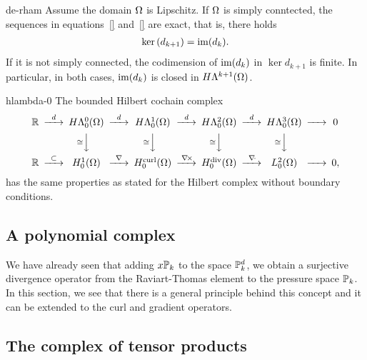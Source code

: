 \begin{Theorem}{de-rham}
  Assume the domain $\domain$ is Lipschitz.  If $\domain$ is simply
  conntected, the sequences in equations~\eqref{} and~\eqref{} are
  exact, that is, there holds
  \begin{gather}
    \ker {d_{k+1}} = \range{d_k}.
  \end{gather}
  If it is not simply connected, the codimension of $\range{d_k}$ in
  $\ker{d_{k+1}}$ is finite. In particular, in both cases,
  $\range{d_k}$ is closed in $H\Lambda^{k+1}(\domain)$.
\end{Theorem}

\begin{Lemma}{hlambda-0}
  The bounded Hilbert cochain complex
  \begin{gather}\minCDarrowwidth20pt
    \begin{CD}
      \R
      @>{d}>> H\Lambda^0_0(\domain)
      @>{d}>> H\Lambda^1_0(\domain)
      @>{d}>> H\Lambda^2_0(\domain)
      @>{d}>> H\Lambda^3_0(\domain)
      @>>> 0
      \\
      @.
      @V{\cong}VV
      @V{\cong}VV
      @V{\cong}VV
      @V{\cong}VV
      \\
      \R
      @>{\subset}>> H^1_0(\domain)
      @>{\nabla}>> \Hcurl_0(\domain)
      @>{\curl}>> \Hdiv_0(\domain)
      @>{\div}>> L^2_0(\domain)
      @>>> 0,
    \end{CD}
  \end{gather}
  has the same properties as stated for the Hilbert complex without
  boundary conditions.
\end{Lemma}

\subsection{A polynomial complex}

\begin{intro}
  We have already seen that adding $x\P_k$ to the space $\P_k^d$, we
  obtain a surjective divergence operator from the Raviart-Thomas
  element to the pressure space $\P_k$. In this section, we see that
  there is a general principle behind this concept and it can be
  extended to the curl and gradient operators.
\end{intro}



\subsection{The complex of tensor products}

